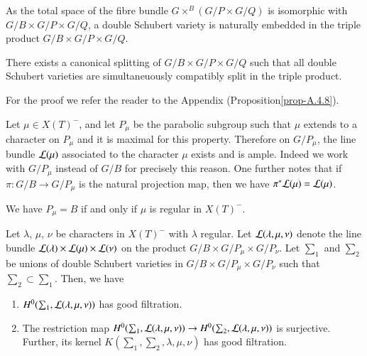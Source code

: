 As the total space of the fibre bundle $G\times^{B}(G/P\times G/Q)$ is
isomorphic with $G/B\times G/P\times G/Q$, a double Schubert variety
is naturally embedded in the triple product $G/B\times G/P\times G/Q$.

\begin{proposition}\label{chap5-prop5.1.2}
There exists a canonical splitting of $G/B\times G/P\times G/Q$ such
that all double Schubert varieties are simultaneuously compatibly
split in the triple product.
\end{proposition}

For the proof we refer the reader to the
Appendix (Proposition\break \ref{prop-A.4.8}). 

Let $\mu\in X(T)^{-}$, and let $P_{\mu}$ be the parabolic subgroup
such that $\mu$ extends to a character on $P_{\mu}$ and it is maximal
for this property. Therefore on $G/P_{\mu}$, the line bundle $\mathcal{L}(\mu)$
associated to the character $\mu$ exists and is ample. Indeed we work
with $G/P_{\mu}$ instead of $G/B$ for precisely this reason. One
further notes that if $\pi:G/B\to G/P_{\mu}$ is the natural projection
map, then we have $\pi^{*}\mathcal{L}(\mu)=\mathcal{L}(\mu)$.

We have $P_{\mu}=B$ if and only if $\mu$ is regular in $X(T)^{-}$.

Let $\lambda$, $\mu$, $\nu$ be characters in $X(T)^{-}$ with $\lambda$
regular. Let $\mathcal{L}(\lambda,\mu,\nu)$ denote the line bundle
$\mathcal{L}(\lambda)\times \mathcal{L}(\mu)\times \mathcal{L}(\nu)$ on the product $G/B\times
G/P_{\mu}\times G/P_{\nu}$. Let $\sum_{1}$ and $\sum_{2}$ be unions of
double Schubert varieties in $G/B\times G/P_{\mu}\times G/P_{\nu}$
such that $\sum_{2}\subset \sum_{1}$. Then, we have

\begin{lemma}\label{chap5-lem5.1.3}
\begin{enumerate}
\renewcommand{\theenumi}{\roman{enumi}}
\renewcommand{\labelenumi}{\rm(\theenumi)}
\item $H^{0}(\sum_{1},\mathcal{L}(\lambda,\mu,\nu))$ has good filtration.

\item The restriction map $H^{0}(\sum_{1},\mathcal{L}(\lambda,\mu,\nu))\to
  H^{0}(\sum_{2},\mathcal{L}(\lambda,\mu,\nu))$ is surjective. Further, its
  kernel $K(\sum_{1},\sum_{2},\lambda,\mu,\nu)$ has good filtration.
\end{enumerate}
\end{lemma}


